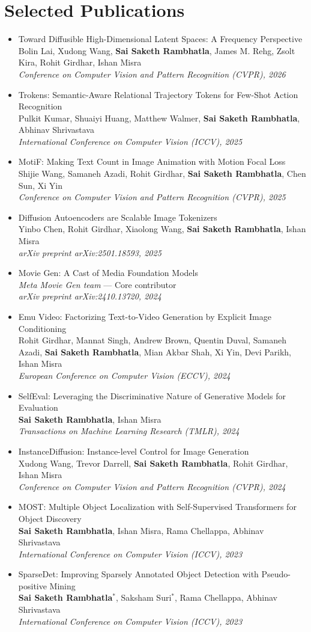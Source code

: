 \documentclass[10pt, letterpaper]{article}
\newcommand{\pub}[3]{\item \begin{minipage}[t]{\linewidth}#1\\#2\\\textcolor{primaryColor!75!black}{\textit{#3}}\end{minipage}} %
\newcommand{\me}{\textbf{Sai Saketh Rambhatla}} %
\begin{document}
    \section{Selected Publications}
\begin{itemize}[itemsep=3pt, parsep=0pt, topsep=2pt]
\pub{Toward Diffusible High-Dimensional Latent Spaces: A Frequency Perspective}
    {Bolin Lai, Xudong Wang, \me, James M. Rehg, Zsolt Kira, Rohit Girdhar, Ishan Misra}
    {Conference on Computer Vision and Pattern Recognition (CVPR), 2026}

\pub{Trokens: Semantic-Aware Relational Trajectory Tokens for Few-Shot Action Recognition}
    {Pulkit Kumar, Shuaiyi Huang, Matthew Walmer, \me, Abhinav Shrivastava}
    {International Conference on Computer Vision (ICCV), 2025}

\pub{MotiF: Making Text Count in Image Animation with Motion Focal Loss}
    {Shijie Wang, Samaneh Azadi, Rohit Girdhar, \me, Chen Sun, Xi Yin}
    {Conference on Computer Vision and Pattern Recognition (CVPR), 2025}

\pub{Diffusion Autoencoders are Scalable Image Tokenizers}
    {Yinbo Chen, Rohit Girdhar, Xiaolong Wang, \me, Ishan Misra}
    {arXiv preprint arXiv:2501.18593, 2025}

\pub{Movie Gen: A Cast of Media Foundation Models}
    {\textit{Meta Movie Gen team} --- Core contributor}
    {arXiv preprint arXiv:2410.13720, 2024}

\pub{Emu Video: Factorizing Text-to-Video Generation by Explicit Image Conditioning}
    {Rohit Girdhar, Mannat Singh, Andrew Brown, Quentin Duval, Samaneh Azadi, \me, Mian Akbar Shah, Xi Yin, Devi Parikh, Ishan Misra}
    {European Conference on Computer Vision (ECCV), 2024}

\pub{SelfEval: Leveraging the Discriminative Nature of Generative Models for Evaluation}
    {\me, Ishan Misra}
    {Transactions on Machine Learning Research (TMLR), 2024}

\pub{InstanceDiffusion: Instance-level Control for Image Generation}
    {Xudong Wang, Trevor Darrell, \me, Rohit Girdhar, Ishan Misra}
    {Conference on Computer Vision and Pattern Recognition (CVPR), 2024}

\pub{MOST: Multiple Object Localization with Self-Supervised Transformers for Object Discovery}
    {\me, Ishan Misra, Rama Chellappa, Abhinav Shrivastava}
    {International Conference on Computer Vision (ICCV), 2023}

\pub{SparseDet: Improving Sparsely Annotated Object Detection with Pseudo-positive Mining}
    {\me$^{*}$, Saksham Suri$^{*}$, Rama Chellappa, Abhinav Shrivastava}
    {International Conference on Computer Vision (ICCV), 2023}


\end{itemize}
\end{document}
